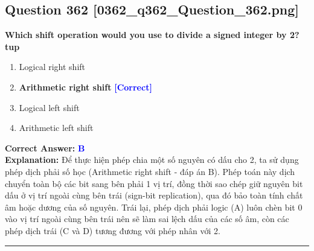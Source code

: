 \documentclass[11pt,a4paper]{article}
\begin{document}
\begin{minipage}{\textwidth}
\subsection*{Question 362 \quad \footnotesize{[0362\_q362\_Question\_362.png]}}
\noindent \textbf{Which shift operation would you use to divide a signed integer by 2? tup}

\begin{enumerate}[label=\Alph*.]
    \item Logical right shift
    \item \textbf{Arithmetic right shift} \hfill \textcolor{blue}{\textbf{[Correct]}}
    \item Logical left shift
    \item Arithmetic left shift
\end{enumerate}

\noindent \textbf{Correct Answer:} \textcolor{blue}{\textbf{B}} \\[2pt]
\noindent \textbf{Explanation:} Để thực hiện phép chia một số nguyên có dấu cho 2, ta sử dụng phép dịch phải số học (Arithmetic right shift - đáp án B). Phép toán này dịch chuyển toàn bộ các bit sang bên phải 1 vị trí, đồng thời sao chép giữ nguyên bit dấu ở vị trí ngoài cùng bên trái (sign-bit replication), qua đó bảo toàn tính chất âm hoặc dương của số nguyên. Trái lại, phép dịch phải logic (A) luôn chèn bit 0 vào vị trí ngoài cùng bên trái nên sẽ làm sai lệch dấu của các số âm, còn các phép dịch trái (C và D) tương đương với phép nhân với 2.

\par\vspace{0.3cm}
\hrule
\vspace{0.3cm}
\end{minipage}
\end{document}
